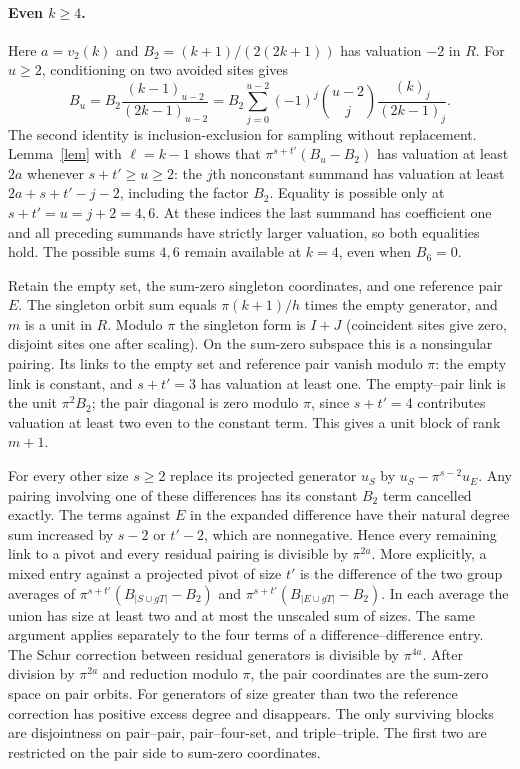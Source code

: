 \documentclass[11pt]{article}
\newcommand{\val}{v_2}
\begin{document}
\paragraph{Even \(k\ge4\).}
Here \(a=\val(k)\) and \(B_2=(k+1)/(2(2k+1))\) has valuation \(-2\)
in \(R\). For \(u\ge2\), conditioning on two avoided sites gives
\[
 B_u=B_2\frac{(k-1)_{u-2}}{(2k-1)_{u-2}}
     = B_2\sum_{j=0}^{u-2}(-1)^j\binom{u-2}{j}
                    \frac{(k)_j}{(2k-1)_j}.
\]
The second identity is inclusion-exclusion for sampling without
replacement. Lemma~\ref{lem} with \(\ell=k-1\) shows that
\(\pi^{s+t'}(B_u-B_2)\) has valuation at least \(2a\) whenever
\(s+t'\ge u\ge2\): the \(j\)th nonconstant summand has valuation at
least \(2a+s+t'-j-2\), including the factor \(B_2\).
Equality is possible only at
\(s+t'=u=j+2=4,6\). At these indices the last summand has coefficient
one and all preceding summands have strictly larger valuation, so
both equalities hold. The possible sums \(4,6\) remain available at
\(k=4\), even when \(B_6=0\).

Retain the empty set, the sum-zero singleton coordinates, and one
reference pair \(E\). The singleton orbit sum equals
\(\pi(k+1)/h\) times the empty generator, and \(m\) is a unit in \(R\).
Modulo \(\pi\) the singleton form is \(I+J\) (coincident sites give
zero, disjoint sites one after scaling). On the sum-zero subspace this
is a nonsingular pairing. Its links to the empty set and reference pair
vanish modulo \(\pi\): the empty link is constant, and \(s+t'=3\) has
valuation at least one. The empty--pair link is the unit \(\pi^2B_2\);
the pair diagonal is zero modulo \(\pi\), since \(s+t'=4\) contributes
valuation at least two even to the constant term. This gives a unit
block of rank \(m+1\).

For every other size \(s\ge2\) replace its projected generator \(u_S\)
by \(u_S-\pi^{s-2}u_E\). Any pairing involving one of these differences
has its constant \(B_2\) term cancelled exactly. The terms against \(E\)
in the expanded difference have their natural degree sum increased
by \(s-2\) or \(t'-2\), which are nonnegative. Hence every remaining link
to a pivot and every residual pairing is divisible by \(\pi^{2a}\).
More explicitly, a mixed entry against a projected pivot of size \(t'\)
is the difference of the two group averages of
\(\pi^{s+t'}(B_{|S\cup gT|}-B_2)\) and
\(\pi^{s+t'}(B_{|E\cup gT|}-B_2)\). In each average the union has size
at least two and at most the unscaled sum of sizes. The same argument
applies separately to the four terms of a difference--difference entry.
The Schur correction between residual generators is divisible by
\(\pi^{4a}\). After division by \(\pi^{2a}\) and reduction modulo \(\pi\),
the pair coordinates are the sum-zero space on pair orbits.
For generators of size greater than two the reference correction
has positive excess degree and disappears. The only surviving
blocks are disjointness on pair--pair, pair--four-set, and
triple--triple. The first two are restricted on the pair side to
sum-zero coordinates.
\end{document}
